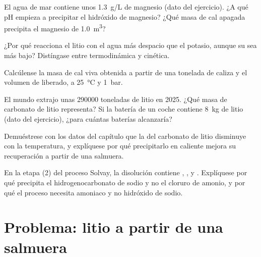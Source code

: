 \begin{exercise}[$\star\star$]\label{exo:b1:s-block:7}
El agua de mar contiene unos \qty{1.3}{g/L} de magnesio (dato del
ejercicio). ¿A qué pH empieza a precipitar el hidróxido de magnesio? ¿Qué
masa de cal apagada precipita el magnesio de \qty{1.0}{m^3}?
\end{exercise}

\begin{exercise}[$\star\star$]\label{exo:b1:s-block:8}
¿Por qué reacciona el litio con el agua más despacio que el potasio,
aunque su  sea más bajo? Distíngase entre
termodinámica y cinética.
\end{exercise}

\begin{exercise}[$\star\star$]\label{exo:b1:s-block:9}
Calcúlense la masa de cal viva obtenida a partir de una tonelada de
caliza y el volumen de  liberado, a \qty{25}{\celsius} y
\qty{1}{bar}.
\end{exercise}

\begin{exercise}[$\star\star\star$]\label{exo:b1:s-block:10}
El mundo extrajo unas \num{290000} toneladas de litio en 2025. ¿Qué masa
de carbonato de litio representa? Si la batería de un coche contiene
\qty{8}{kg} de litio (dato del ejercicio), ¿para cuántas baterías
alcanzaría?
\end{exercise}

\begin{exercise}[$\star\star\star$]\label{exo:b1:s-block:11}
Demuéstrese con los datos del capítulo que la  del carbonato
de litio disminuye con la temperatura, y explíquese por qué precipitarlo
en caliente mejora su recuperación a partir de una salmuera.
\end{exercise}

\begin{exercise}[$\star\star\star$]\label{exo:b1:s-block:12}
En la etapa (2) del proceso Solvay, la disolución contiene ,
,  y . Explíquese por qué precipita el
hidrogenocarbonato de sodio y no el cloruro de amonio, y por qué el
proceso necesita amoniaco y no hidróxido de sodio.
\end{exercise}

\section{Problema: litio a partir de una salmuera}

